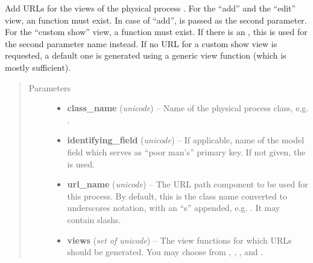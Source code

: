 \documentclass[a4paper,11pt,english]{sphinxmanual}
\begin{document}
\begin{fulllineitems}
\begin{fulllineitems}
\label{programming/utilities:samples.utils.urls.PatternGenerator.physical_process}
Add URLs for the views of the physical process .  For the “add”
and the “edit” view, an 
function must exist.  In case of “add”,  is passed as the
second parameter.  For the “custom show” view, a  function must exist.  If there is an
, this is used for the second parameter name
instead.  If no URL for a custom show view is requested, a default one
is generated using a generic view function (which is mostly
sufficient).
\begin{quote}\begin{description}
\item[{Parameters}] \leavevmode\begin{itemize}
\item {} 
\textbf{class\_name} (\emph{unicode}) -- Name of the physical process class,
e.g. .

\item {} 
\textbf{identifying\_field} (\emph{unicode}) -- If applicable, name of the model field which
serves as “poor man's” primary key.  If not given, the  is
used.

\item {} 
\textbf{url\_name} (\emph{unicode}) -- The URL path component to be used for this process.  By
default, this is the class name converted to underscores notation,
with an “s” appended, e.g. .  It may
contain slashs.

\item {} 
\textbf{views} (\emph{set of unicode}) -- The view functions for which URLs should be generated.
You may choose from , , , and
.

\end{itemize}

\end{description}\end{quote}

\end{fulllineitems}


\end{fulllineitems}
\end{document}
